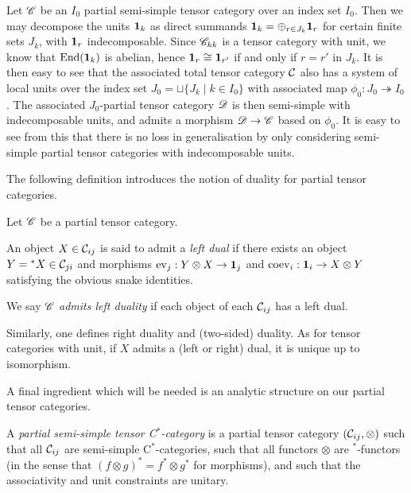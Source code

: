 Let $\mathscr{C}$ be an $I_0$ partial semi-simple tensor category over an index set $I_0$. Then we may decompose the units $\mathbf{1}_k$ as direct summands $\mathbf{1}_k = \oplus_{r\in J_k} \mathbf{1}_r$ for certain finite sets $J_k$, with $\mathbf{1}_r$ indecomposable. Since $\mathscr{C}_{kk}$ is a tensor category with unit, we know that $\operatorname{\mathrm{End}}(\mathbf{1}_k)$ is abelian, hence $\mathbf{1}_r\cong \mathbf{1}_{r'}$ if and only if $r=r'$ in $J_k$. It is then easy to see that the associated total tensor category $\mathcal{C}$ also has a system of local units over the index set $J_0=\sqcup\{J_k\mid k\in I_0\}$ with associated map $\phi_0:J_0 \twoheadrightarrow I_0$. The associated $J_0$-partial tensor category $\mathscr{D}$ is then semi-simple with indecomposable units, and admits a morphism $\mathscr{D}\rightarrow \mathscr{C}$ based on $\phi_0$. It is easy to see from this that there is no loss in generalisation by only considering semi-simple partial tensor categories with indecomposable units.
 

The following definition introduces the notion of duality for partial tensor categories.

\begin{Def} Let $\mathscr{C}$ be a partial tensor category. 

An object $X\in \mathcal{C}_{ij}$ is said to admit a \emph{left dual} if there exists an object $Y={}^*X \in \mathcal{C}_{ji}$ and morphisms $\mathrm{ev}_{j}: Y\otimes X \rightarrow \mathbf{1}_j$ and $\mathrm{coev}_i: \mathbf{1}_i\rightarrow X\otimes Y$ satisfying the obvious snake identities.

We say $\mathscr{C}$ \emph{admits left duality} if each object of each $\mathcal{C}_{ij}$ has a left dual.
\end{Def}

Similarly, one defines right duality and (two-sided) duality. As for tensor categories with unit, if $X$ admits a (left or right) dual, it is unique up to isomorphism. 

A final ingredient which will be needed is an analytic structure on our partial tensor categories.

\begin{Def} A \emph{partial semi-simple tensor C$^*$-category} is a partial tensor category $(\mathcal{C}_{ij},\otimes)$ such that all $\mathcal{C}_{ij}$ are semi-simple C$^*$-categories, such that all functors $\otimes$ are $^*$-functors (in the sense that $(f\otimes g)^* = f^*\otimes g^*$ for morphisms), and such that the associativity and unit constraints are unitary.
\end{Def} 



